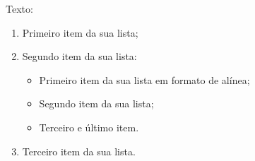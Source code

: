 Texto:

\begin{enumerate}[label=\alph*)]
    \item Primeiro item da sua lista;
    \item Segundo item da sua lista:
        \begin{itemize}[label={-}]
            \item Primeiro item da sua lista em formato de alínea;
            \item Segundo item da sua lista;
            \item Terceiro e último item.
        \end{itemize}
    \item Terceiro item da sua lista.
\end{enumerate}